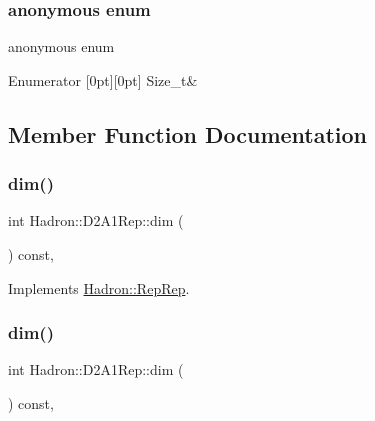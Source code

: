 \subsubsection{\texorpdfstring{anonymous enum}{anonymous enum}}
{\footnotesize\ttfamily anonymous enum}

\begin{DoxyEnumFields}{Enumerator}
[0pt][0pt]{}\mbox{\label{structHadron_1_1D2A1Rep_ad7026fc451e41d37450fe2b71ab68ed2ae2b29155c82be78577eed84b15b0b5b6}} 
Size\+\_\+t&\\
\hline

\end{DoxyEnumFields}


\subsection{Member Function Documentation}
\mbox{\label{structHadron_1_1D2A1Rep_aba72a454b36e387861f8984650234865}} 
\subsubsection{\texorpdfstring{dim()}{dim()}\hspace{0.1cm}{\footnotesize\ttfamily [1/5]}}
{\footnotesize\ttfamily int Hadron\+::\+D2\+A1\+Rep\+::dim (\begin{DoxyParamCaption}{ }\end{DoxyParamCaption}) const\hspace{0.3cm}{\ttfamily [inline]}, {\ttfamily [virtual]}}



Implements \mbox{\hyperlink{structHadron_1_1RepRep_a92c8802e5ed7afd7da43ccfd5b7cd92b}{Hadron\+::\+Rep\+Rep}}.

\mbox{\label{structHadron_1_1D2A1Rep_aba72a454b36e387861f8984650234865}} 
\subsubsection{\texorpdfstring{dim()}{dim()}\hspace{0.1cm}{\footnotesize\ttfamily [2/5]}}
{\footnotesize\ttfamily int Hadron\+::\+D2\+A1\+Rep\+::dim (\begin{DoxyParamCaption}{ }\end{DoxyParamCaption}) const\hspace{0.3cm}{\ttfamily [inline]}, {\ttfamily [virtual]}}



